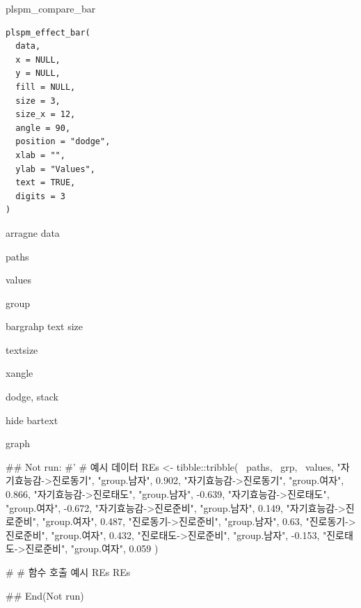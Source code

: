 \documentclass[a4paper]{book}
\begin{document}
%
\begin{Description}
plspm\_compare\_bar
\end{Description}
%
\begin{Usage}
\begin{verbatim}
plspm_effect_bar(
  data,
  x = NULL,
  y = NULL,
  fill = NULL,
  size = 3,
  size_x = 12,
  angle = 90,
  position = "dodge",
  xlab = "",
  ylab = "Values",
  text = TRUE,
  digits = 3
)
\end{verbatim}
\end{Usage}
%
\begin{Arguments}
\begin{ldescription}
\item[\code{data}] arragne data

\item[\code{x}] paths

\item[\code{y}] values

\item[\code{fill}] group

\item[\code{size}] bargrahp text size

\item[\code{size\_x}] textsize

\item[\code{angle}] xangle

\item[\code{position}] dodge, stack

\item[\code{text}] hide bartext
\end{ldescription}
\end{Arguments}
%
\begin{Value}
graph
\end{Value}
%
\begin{Examples}
\begin{ExampleCode}

\#\# Not run: 
#'
# 예시 데이터
REs <- tibble::tribble(
  ~paths, ~grp, ~values,
  "자기효능감->진로동기", "group.남자", 0.902,
  "자기효능감->진로동기", "group.여자", 0.866,
  "자기효능감->진로태도", "group.남자", -0.639,
  "자기효능감->진로태도", "group.여자", -0.672,
  "자기효능감->진로준비", "group.남자", 0.149,
  "자기효능감->진로준비", "group.여자", 0.487,
  "진로동기->진로준비", "group.남자", 0.63,
  "진로동기->진로준비", "group.여자", 0.432,
  "진로태도->진로준비", "group.남자", -0.153,
  "진로태도->진로준비", "group.여자", 0.059
)

# # 함수 호출 예시
REs %
REs %

## End(Not run)

\end{ExampleCode}
\end{Examples}
\end{document}
